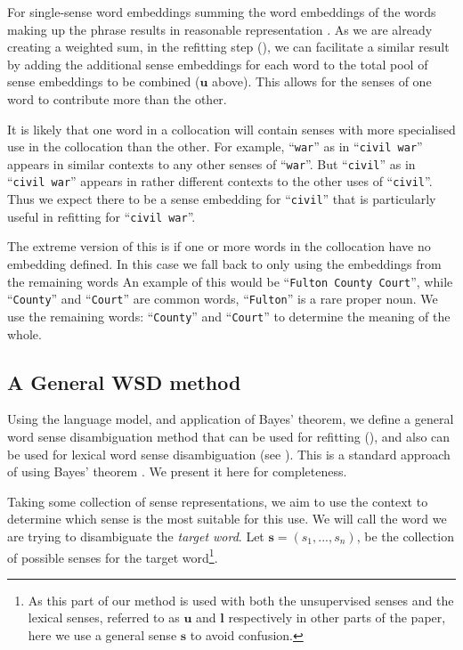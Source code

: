 \documentclass{article} %
\def\parencite{\cite} %
\newcommand{\s}{\mathbf{s}}
\renewcommand{\l}{\mathbf{l}}
\renewcommand{\u}{\mathbf{u}}
\newcommand{\wordquote}[1]{\enquote{\texttt{#1}}}
\providecommand{\DIFaddbegin}{} %
\providecommand{\DIFaddend}{} %
\providecommand{\DIFdelbegin}{} %
\providecommand{\DIFdelend}{} %
\begin{document}
For single-sense word embeddings  summing the word embeddings of the words making up the phrase results in reasonable representation \DIFdelbegin %
\DIFdelend \DIFaddbegin \parencite{mikolovSkip,White2015SentVecMeaning}\DIFaddend .
As we are already creating a weighted sum, in the refitting step (), we can facilitate a similar result by adding the additional sense embeddings for each word to the total pool of sense embeddings to be combined ($\u$ above). This allows for the senses of one word to contribute more than the other.

It is likely that one word in a collocation will contain senses with more specialised use in the collocation than the other.
For example, \wordquote{war} as in \wordquote{civil war} appears in similar contexts to any other senses of \wordquote{war}.
But \wordquote{civil} as in \wordquote{civil war} appears in rather different contexts to the other uses of \wordquote{civil}. Thus we expect there to be a sense embedding for \wordquote{civil} that is particularly useful in refitting for \wordquote{civil war}.


The extreme version of this is if one or more words in the collocation have no embedding defined. In this case we fall back to only using the embeddings from the remaining words An example of this would be \wordquote{Fulton County Court}, while \wordquote{County} and \wordquote{Court} are common words, \wordquote{Fulton} is a rare proper noun. We use the remaining words: \wordquote{County} and \wordquote{Court} to determine the meaning of the whole.



\subsection{A General WSD method} \label{generalwsd}
Using the language model, and application of Bayes' theorem, we define a general word sense disambiguation method that can be used for refitting (), and also can be used for lexical word sense disambiguation (see ). This is a standard approach of using Bayes' theorem \DIFdelbegin %
\DIFdelend \DIFaddbegin \parencite{tian2014probabilistic,AdaGrams}\DIFaddend . We present it here for completeness.

Taking some collection of sense representations, we aim to use the context to determine which sense is the most suitable for this use.
We will call the word we are trying to disambiguate the \emph{target word}.
Let $\s=(s_{1},...,s_{n})$, be the collection of possible senses for the target word\footnote{As this part of our method is used with both the unsupervised senses and the lexical senses, referred to as $\u$ and $\l$ respectively in other parts of the paper, here we use a general sense $\s$ to avoid confusion.}.
\end{document}
